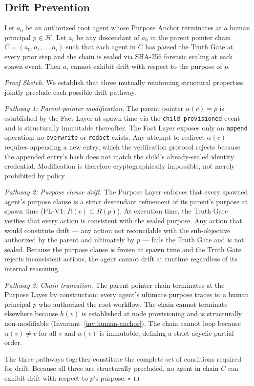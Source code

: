 \subsection{Drift Prevention}

\begin{theorem}
\label{th:drift-prevention}
Let $a_0$ be an authorized root agent whose Purpose Anchor terminates at a human principal $p \in \mathcal{H}$. Let $a_i$ be any descendant of $a_0$ in the parent pointer chain $C = (a_0, a_1, \ldots, a_i)$ such that each agent in $C$ has passed the Truth Gate at every prior step and the chain is sealed via SHA-256 forensic sealing at each spawn event. Then $a_i$ cannot exhibit drift with respect to the purpose of $p$.
\end{theorem}

\begin{proof}[Proof Sketch]
We establish that three mutually reinforcing structural properties jointly preclude each possible drift pathway.

\textit{Pathway 1: Parent-pointer modification.} The parent pointer $\alpha(c) = p$ is established by the Fact Layer at spawn time via the \texttt{child-provisioned} event and is structurally immutable thereafter. The Fact Layer exposes only an \texttt{append} operation; no \texttt{overwrite} or \texttt{redact} exists. Any attempt to redirect $\alpha(c)$ requires appending a new entry, which the verification protocol rejects because the appended entry's hash does not match the child's already-sealed identity credential. Modification is therefore cryptographically impossible, not merely prohibited by policy.

\textit{Pathway 2: Purpose clause drift.} The Purpose Layer enforces that every spawned agent's purpose clause is a strict descendant refinement of its parent's purpose at spawn time (PL-V1: $R(c) \subset R(p)$). At execution time, the Truth Gate verifies that every action is consistent with the sealed purpose. Any action that would constitute drift — any action not reconcilable with the sub-objective authorized by the parent and ultimately by $p$ — fails the Truth Gate and is not sealed. Because the purpose clause is frozen at spawn time and the Truth Gate rejects inconsistent actions, the agent cannot drift at runtime regardless of its internal reasoning.

\textit{Pathway 3: Chain truncation.} The parent pointer chain terminates at the Purpose Layer by construction: every agent's ultimate purpose traces to a human principal $p$ who authorized the root workflow. The chain cannot terminate elsewhere because $h(v)$ is established at node provisioning and is structurally non-modifiable (Invariant~\ref{inv:human-anchor}). The chain cannot loop because $\alpha(v) \neq v$ for all $v$ and $\alpha(v)$ is immutable, defining a strict acyclic partial order.

The three pathways together constitute the complete set of conditions required for drift. Because all three are structurally precluded, no agent in chain $C$ can exhibit drift with respect to $p$'s purpose. $\square$
\end{proof}

